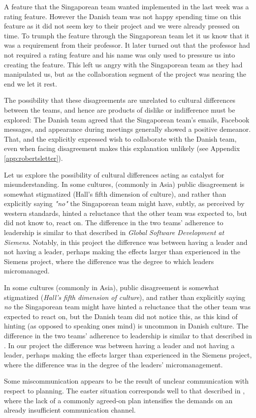 A feature that the Singaporean team wanted implemented in the last week was
a rating feature. However the Danish team was not happy spending time on this
feature as it did not seem key to their project and we were already pressed on 
time. To trumph the feature through the Singaporean team let it us know
that it was a requirement from their professor. It later turned out that the
professor had not required a rating feature and his name was only used
to pressure us into creating the feature. This left us angry with the 
Singaporean team as they had manipulated us, but as the collaboration
segment of the project was nearing the end we let it rest.

The possibility that these disagreements are unrelated to cultural differences
between the teams, and hence are products of dislike or indifference must be
explored: The Danish team agreed that the Singaporean team's emails, Facebook
messages, and appearance during meetings generally showed a positive demeanor.
That, and the explicitly expressed wish to collaborate with the Danish team,
even when facing disagreement makes this explanation unlikely (see Appendix
\ref{app:robertsletter}).

Let us explore the possibility of cultural differences acting as catalyst for
misunderstanding. In some cultures, (commonly in Asia) public disagreement is
somewhat stigmatized (Hall's fifth dimension of
culture)\cite{surprises}\cite{herbsiemens}, and rather than explicitly saying
\emph{"no"} the Singaporean team might have, subtly, as perceived by western
standards, hinted a reluctance that the other team was expected to, but did not
know to, react on. The difference in the two teams' adherence to leadership is
similar to that described in \emph{Global Software Development at
Siemens}\cite{herbsiemens}. Notably, in this project the difference was between
having a leader and not having a leader, perhaps making the effects larger than
experienced in the Siemens project, where the difference was the degree to which
leaders micromanaged.

In some cultures (commonly in Asia), public disagreement is somewhat
stigmatized (\emph{Hall's fifth dimension of
culture})\cite{surprises}\cite{herbsiemens}, and rather than explicitly saying
\emph{no} the Singaporean team might have hinted a reluctance that the other
team was expected to react on, but the Danish team did not notice this, as this
kind of hinting (as opposed to speaking ones mind) is uncommon in Danish
culture. The difference in the two teams' adherence to leadership is similar to
that described in \cite{herbsiemens}. In our project the difference was between
having a leader and not having a leader, perhaps making the effects larger than
experienced in the Siemens project, where the difference was in the degree of
the leaders' micromanagement.

Some miscommunication appears to be the result of unclear communication with
respect to planning. The easter situation corresponds well to that described in
\cite[sec.~3.1.2]{herbsiemens}, where the lack of a commonly agreed-on plan
intensifies the demands on an already insufficient communication channel.
